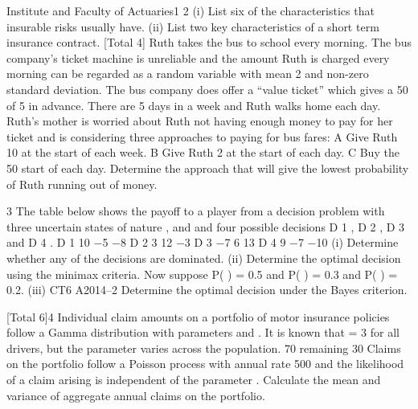 \documentclass[a4paper,12pt]{article}
\begin{document}
\begin{enumerate}

Institute and Faculty of Actuaries1
2
(i) List six of the characteristics that insurable risks usually have. 
(ii) List two key characteristics of a short term insurance contract. 
[Total 4]
Ruth takes the bus to school every morning. The bus company’s ticket machine is
unreliable and the amount Ruth is charged every morning can be regarded as a
random variable with mean 2 and non-zero standard deviation. The bus company
does offer a “value ticket” which gives a 50%
of 5 in advance. There are 5 days in a week and Ruth walks home each day.
Ruth’s mother is worried about Ruth not having enough money to pay for her ticket
and is considering three approaches to paying for bus fares:
A Give Ruth 10 at the start of each week.
B Give Ruth 2 at the start of each day.
C Buy the 50%
start of each day.
Determine the approach that will give the lowest probability of Ruth running out of
money.

3
The table below shows the payoff to a player from a decision problem with three
uncertain states of nature  ,  and  and four possible decisions D 1 , D 2 , D 3 and D 4 .
D 1
10
−5
−8
D 2
3
12
−3
D 3
−7
6
13
D 4
9
−7
−10
(i) Determine whether any of the decisions are dominated. 
(ii) Determine the optimal decision using the minimax criteria. 
Now suppose P( ) = 0.5 and P( ) = 0.3 and P( ) = 0.2.
(iii)
CT6 A2014–2
Determine the optimal decision under the Bayes criterion.

[Total 6]4
Individual claim amounts on a portfolio of motor insurance policies follow a Gamma
distribution with parameters \alpha and \lambda. It is known that \lambda = 3 for all drivers, but the
parameter \alpha varies across the population. 70%
remaining 30%
Claims on the portfolio follow a Poisson process with annual rate 500 and the
likelihood of a claim arising is independent of the parameter \alpha.
Calculate the mean and variance of aggregate annual claims on the portfolio.





\end{enumerate}
\end{document}
